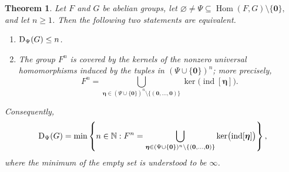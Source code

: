 \documentclass[a4paper, 12pt]{article}
\newtheorem{theorem}{Theorem}[section]
\begin{document}
\begin{theorem}\label{thm:kernel-cover}
Let $F$ and $G$ be abelian groups, let
$\varnothing\neq\Psi\subseteq\operatorname{Hom}(F,G)\setminus\{\mathbf 0\},$
and let $n\ge 1$. Then the following two statements are equivalent.
\begin{enumerate}
  \item[\rm (i)] ${\rm D}_{\Psi}(G)\le n$.

  \item[\rm (ii)] The group $F^n$ is covered by the kernels of the
  nonzero universal homomorphisms induced by the tuples in
  $(\Psi\cup\{\mathbf 0\})^n$; more precisely,
  $$F^n=\bigcup_{\boldsymbol{\eta}\in
      (\Psi\cup\{\mathbf 0\})^n\setminus\{(\mathbf 0,\ldots,\mathbf 0)\}}
    \ker\bigl(\operatorname{ind}[\boldsymbol{\eta}]\bigr).$$
\end{enumerate}

Consequently,
\begin{equation}\label{eq:D-minimum}
 {\rm D}_{\Psi}(G)
 =
 \min\left\{
 n\in\mathbb N:
 F^n
 =
 \bigcup_{\boldsymbol{\eta}\in
   (\Psi\cup\{\mathbf 0\})^n\setminus
   \{(\mathbf 0,\ldots,\mathbf 0)\}}
 \ker\bigl(\operatorname{ind}[\boldsymbol{\eta}]\bigr)
 \right\},
\end{equation}
where the minimum of the empty set is understood to be $\infty$.
\end{theorem}
\end{document}
